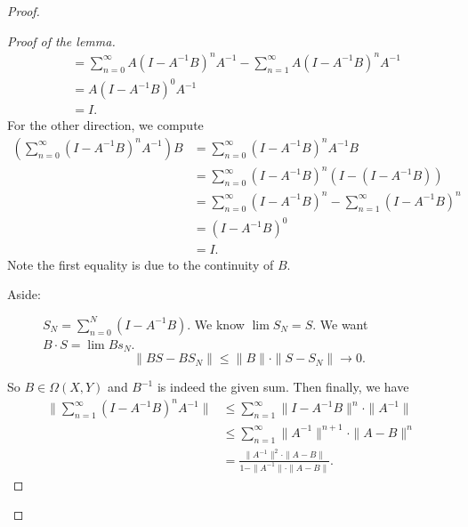 \documentclass[12pt]{article}
\theoremstyle{plain}
\theoremstyle{definition}
\begin{document}
\begin{proof}
\begin{description}
\begin{proof}[Proof of the lemma]
\[\begin{aligned}
                    &=\sum_{n=0}^\infty A(I-A^{-1}B)^nA^{-1} - \sum_{n=1}^\infty A(I-A^{-1}B)^nA^{-1}\\
                    &=A(I-A^{-1}B)^0A^{-1}\\
                    &=I.
                \end{aligned}\]
                For the other direction, we compute
                \[\begin{aligned}
                        \left(\sum_{n=0}^\infty (I-A^{-1}B)^nA^{-1}\right)B
                        &= \sum_{n=0}^\infty (I-A^{-1}B)^n A^{-1}B\\
                        &=\sum_{n=0}^\infty (I-A^{-1}B)^n(I-(I-A^{-1}B))\\
                        &=\sum_{n=0}^\infty (I-A^{-1}B)^n - \sum_{n=1}^\infty (I-A^{-1}B)^n\\
                        &=(I-A^{-1}B)^0\\
                        &=I.
                \end{aligned}\]
                Note the first equality is due to the continuity of $B$.
                \begin{description}
                    \item[Aside: ]
                        $S_N=\sum_{n=0}^N(I-A^{-1}B)$.
                        We know $\lim S_N=S$.
                        We want $B\cdot S=\lim Bs_N$.
                        \[
                            \|BS-BS_N\| \leq \|B\|\cdot\|S-S_N\| \rightarrow 0.
                        \]
                \end{description}
                So $B\in\Omega(X,Y)$ and $B^{-1}$ is indeed the given sum.
                Then finally, we have
                \[
                    \begin{aligned}
                        \|\sum_{n=1}^\infty (I-A^{-1}B)^nA^{-1}\|
                        &\leq \sum_{n=1}^\infty \|I-A^{-1}B\|^n\cdot\|A^{-1}\|\\
                        &\leq \sum_{n=1}^\infty \|A^{-1}\|^{n+1}\cdot\|A-B\|^n\\
                        &=\frac{\|A^{-1}\|^2\cdot\|A-B\|}{1-\|A^{-1}\|\cdot\|A-B\|}.
                    \end{aligned}
                \]
            \end{proof}
    \end{description}
\end{proof}
\end{document}

